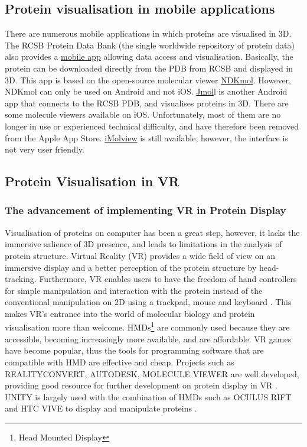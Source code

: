  \subsection{Protein visualisation in mobile applications}

There are numerous mobile applications in which proteins are visualised in 3D. The RCSB Protein Data Bank (the single worldwide repository of protein data) also provides a \href{https://www.ncbi.nlm.nih.gov/pmc/articles/PMC4271143/}{mobile app} allowing data access and visualisation. Basically, the protein can be downloaded directly from the PDB from RCSB and displayed in 3D. This app is based on the open-source molecular viewer \href{https://play.google.com/store/apps/details?id=jp.sfjp.webglmol.NDKmol&hl=en}{NDKmol}. However, NDKmol can only be used on Android and not iOS. \href{https://www.imedicalapps.com/2013/08/jmol-molecular-visualization-app/}{Jmol}l is another Android app that connects to the RCSB PDB, and visualises proteins in 3D.
There are some molecule viewers available on iOS. Unfortunately, most of them are no longer in use or experienced technical difficulty, and have therefore been removed from the Apple App Store. \href{https://www.molsoft.com/iMolview.html}{iMolview} is still available, however, the interface is not very user friendly. 


\subsection{Protein Visualisation in VR}
\subsubsection{The advancement of implementing VR in Protein Display}
Visualisation of proteins on computer has been a great step, however, it lacks the immersive salience of 3D presence, and leads to limitations in the analysis of protein structure. Virtual Reality (VR) provides a wide field of view on an immersive display and a better perception of the protein structure by head-tracking. Furthermore, VR enables users to have the freedom of hand controllers for simple manipulation and interaction with the protein instead of the conventional manipulation on 2D using a trackpad, mouse and keyboard \parencite{goddard_molecular_2018}. This makes VR's entrance into the world of molecular biology and protein visualisation more than welcome. 
HMDs\footnote{Head Mounted Display} are commonly used because they are accessible, becoming increasingly more available, and are affordable. VR games have become popular, thus the tools for programming software that are compatible with HMD are effective and cheap. Projects such as {\footnotesize REALITYCONVERT}, {\footnotesize AUTODESK}, {\footnotesize MOLECULE VIEWER} are well developed, providing good resource for further development on protein display in VR \parencite{ratamero_touching_2018}. {\footnotesize UNITY} is largely used with the combination of HMDs such as {\footnotesize OCULUS RIFT} and {\footnotesize HTC VIVE} to display and manipulate proteins \parencite{ratamero_touching_2018}.

